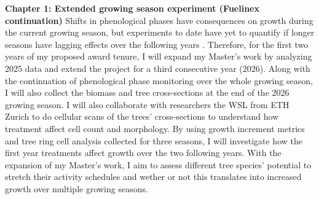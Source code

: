 \documentclass[12pt]{article}
\begin{document}
\textbf{Chapter 1: Extended growing season experiment (Fuelinex continuation)}
Shifts in phenological phases have consequences on growth during the current growing season, but experiments to date have yet to quantify if longer seasons have lagging effects over the following years \citep{chapin_ecology_1990,landhausser_partitioning_2012,lawrence_variable_2018,martens_first-year_2007,schott_premature_2013}. Therefore, for the first two years of my proposed award tenure, I will expand my Master's work by analyzing 2025 data and extend the project for a third consecutive year (2026). Along with the continuation of phenological phase monitoring over the whole growing season, I will also collect the biomass and tree cross-sections at the end of the 2026 growing season. I will also collaborate with researchers the WSL from ETH Zurich to do cellular scans of the trees' cross-sections to understand how treatment affect cell count and morphology. By using growth increment metrics and tree ring cell analysis collected for three seasons, I will investigate how the first year treatments affect growth over the two following years. With the expansion of my Master's work, I aim to assess different tree species’ potential to stretch their activity schedules and wether or not this translates into increased growth over multiple growing seasons. \\
\end{document}
